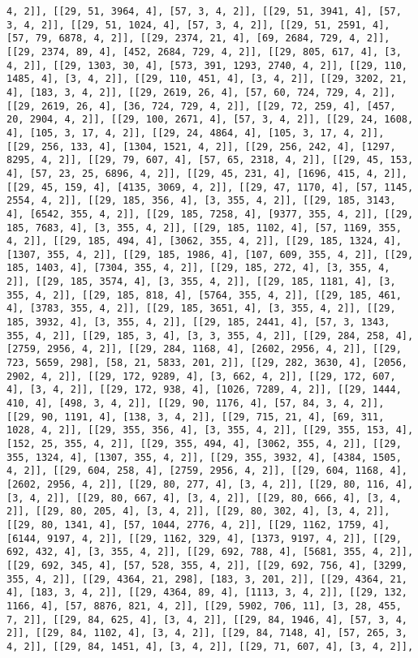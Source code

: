 \documentclass[12pt,fleqn]{article}\usepackage{../../common}
\begin{document}
\begin{verbatim}
4, 2]], [[29, 51, 3964, 4], [57, 3, 4, 2]], [[29, 51, 3941, 4], [57, 3, 4, 2]], [[29, 51, 1024, 4], [57, 3, 4, 2]], [[29, 51, 2591, 4], [57, 79, 6878, 4, 2]], [[29, 2374, 21, 4], [69, 2684, 729, 4, 2]], [[29, 2374, 89, 4], [452, 2684, 729, 4, 2]], [[29, 805, 617, 4], [3, 4, 2]], [[29, 1303, 30, 4], [573, 391, 1293, 2740, 4, 2]], [[29, 110, 1485, 4], [3, 4, 2]], [[29, 110, 451, 4], [3, 4, 2]], [[29, 3202, 21, 4], [183, 3, 4, 2]], [[29, 2619, 26, 4], [57, 60, 724, 729, 4, 2]], [[29, 2619, 26, 4], [36, 724, 729, 4, 2]], [[29, 72, 259, 4], [457, 20, 2904, 4, 2]], [[29, 100, 2671, 4], [57, 3, 4, 2]], [[29, 24, 1608, 4], [105, 3, 17, 4, 2]], [[29, 24, 4864, 4], [105, 3, 17, 4, 2]], [[29, 256, 133, 4], [1304, 1521, 4, 2]], [[29, 256, 242, 4], [1297, 8295, 4, 2]], [[29, 79, 607, 4], [57, 65, 2318, 4, 2]], [[29, 45, 153, 4], [57, 23, 25, 6896, 4, 2]], [[29, 45, 231, 4], [1696, 415, 4, 2]], [[29, 45, 159, 4], [4135, 3069, 4, 2]], [[29, 47, 1170, 4], [57, 1145, 2554, 4, 2]], [[29, 185, 356, 4], [3, 355, 4, 2]], [[29, 185, 3143, 4], [6542, 355, 4, 2]], [[29, 185, 7258, 4], [9377, 355, 4, 2]], [[29, 185, 7683, 4], [3, 355, 4, 2]], [[29, 185, 1102, 4], [57, 1169, 355, 4, 2]], [[29, 185, 494, 4], [3062, 355, 4, 2]], [[29, 185, 1324, 4], [1307, 355, 4, 2]], [[29, 185, 1986, 4], [107, 609, 355, 4, 2]], [[29, 185, 1403, 4], [7304, 355, 4, 2]], [[29, 185, 272, 4], [3, 355, 4, 2]], [[29, 185, 3574, 4], [3, 355, 4, 2]], [[29, 185, 1181, 4], [3, 355, 4, 2]], [[29, 185, 818, 4], [5764, 355, 4, 2]], [[29, 185, 461, 4], [3783, 355, 4, 2]], [[29, 185, 3651, 4], [3, 355, 4, 2]], [[29, 185, 3932, 4], [3, 355, 4, 2]], [[29, 185, 2441, 4], [57, 3, 1343, 355, 4, 2]], [[29, 185, 3, 4], [3, 3, 355, 4, 2]], [[29, 284, 258, 4], [2759, 2956, 4, 2]], [[29, 284, 1168, 4], [2602, 2956, 4, 2]], [[29, 723, 5659, 298], [58, 21, 5833, 201, 2]], [[29, 282, 3630, 4], [2056, 2902, 4, 2]], [[29, 172, 9289, 4], [3, 662, 4, 2]], [[29, 172, 607, 4], [3, 4, 2]], [[29, 172, 938, 4], [1026, 7289, 4, 2]], [[29, 1444, 410, 4], [498, 3, 4, 2]], [[29, 90, 1176, 4], [57, 84, 3, 4, 2]], [[29, 90, 1191, 4], [138, 3, 4, 2]], [[29, 715, 21, 4], [69, 311, 1028, 4, 2]], [[29, 355, 356, 4], [3, 355, 4, 2]], [[29, 355, 153, 4], [152, 25, 355, 4, 2]], [[29, 355, 494, 4], [3062, 355, 4, 2]], [[29, 355, 1324, 4], [1307, 355, 4, 2]], [[29, 355, 3932, 4], [4384, 1505, 4, 2]], [[29, 604, 258, 4], [2759, 2956, 4, 2]], [[29, 604, 1168, 4], [2602, 2956, 4, 2]], [[29, 80, 277, 4], [3, 4, 2]], [[29, 80, 116, 4], [3, 4, 2]], [[29, 80, 667, 4], [3, 4, 2]], [[29, 80, 666, 4], [3, 4, 2]], [[29, 80, 205, 4], [3, 4, 2]], [[29, 80, 302, 4], [3, 4, 2]], [[29, 80, 1341, 4], [57, 1044, 2776, 4, 2]], [[29, 1162, 1759, 4], [6144, 9197, 4, 2]], [[29, 1162, 329, 4], [1373, 9197, 4, 2]], [[29, 692, 432, 4], [3, 355, 4, 2]], [[29, 692, 788, 4], [5681, 355, 4, 2]], [[29, 692, 345, 4], [57, 528, 355, 4, 2]], [[29, 692, 756, 4], [3299, 355, 4, 2]], [[29, 4364, 21, 298], [183, 3, 201, 2]], [[29, 4364, 21, 4], [183, 3, 4, 2]], [[29, 4364, 89, 4], [1113, 3, 4, 2]], [[29, 132, 1166, 4], [57, 8876, 821, 4, 2]], [[29, 5902, 706, 11], [3, 28, 455, 7, 2]], [[29, 84, 625, 4], [3, 4, 2]], [[29, 84, 1946, 4], [57, 3, 4, 2]], [[29, 84, 1102, 4], [3, 4, 2]], [[29, 84, 7148, 4], [57, 265, 3, 4, 2]], [[29, 84, 1451, 4], [3, 4, 2]], [[29, 71, 607, 4], [3, 4, 2]], 
\end{verbatim}
\end{document}
